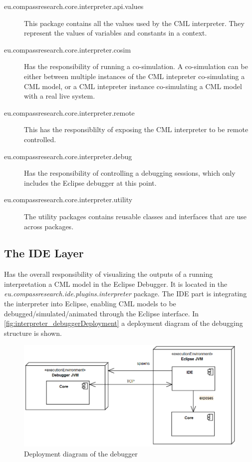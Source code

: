 \documentclass[a4paper, 10pt]{include/compassreport}   %
\begin{document}
\begin{description}
\item[eu.compassresearch.core.interpreter.api.values] This package
  contains all the values used by the CML interpreter. They represent
  the values of variables and constants in a context.

\item[eu.compassresearch.core.interpreter.cosim] Has the responsibility
  of running a co-simulation. A co-simulation can be either between
  multiple instances of the CML intepreter co-simulating a CML model, or
  a CML intepreter instance co-simulating a CML model with a real live
  system.

\item[eu.compassresearch.core.interpreter.remote] This has the
  responsiblilty of exposing the CML interpreter to be remote
  controlled.

\item[eu.compassresearch.core.interpreter.debug] Has the
  responsibility of controlling a debugging sessions, which only
  includes the Eclipse debugger at this point.

\item[eu.compassresearch.core.interpreter.utility] The utility
  packages contains reusable classes and interfaces that are use across
  packages.

\end{description}

\subsection{The IDE Layer}

Has the overall responsibility of visualizing the outputs of a running
interpretation a CML model in the Eclipse Debugger. It is located in
the \emph{eu.compassresearch.ide.plugins.interpreter} package.  The
IDE part is integrating the interpreter into Eclipse, enabling CML
models to be debugged/simulated/animated through the Eclipse
interface. In \autoref{fig:interpreter_debuggerDeployment} a
deployment diagram of the debugging structure is shown.

\begin{figure}[ht!]
  \begin{center}
    \includegraphics[width=1\textwidth]{figures/DebuggerDeploymentView}
    \caption{Deployment diagram of the debugger}
    \label{fig:interpreter_debuggerDeployment}
   \end{center}
\end{figure}
\end{document}
